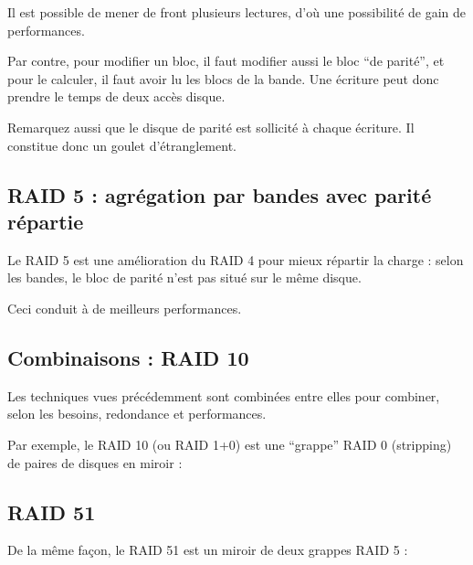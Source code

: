 \begin{multicols}{2}
Il est possible de mener de front plusieurs lectures, d'où une possibilité
de gain de performances.


Par contre, pour modifier un bloc, il faut modifier aussi le bloc ``de parité'',
et pour le calculer, il faut avoir lu les blocs de la bande. Une écriture
peut donc prendre le temps de deux accès disque.

Remarquez aussi que le disque de parité est sollicité à chaque écriture.
Il constitue donc un goulet d'étranglement.


\subsection{RAID 5 : agrégation par bandes avec parité répartie}

Le RAID 5 est une amélioration du RAID 4 pour mieux répartir la charge :
selon les bandes, le bloc de parité n'est pas situé sur le même disque.



Ceci conduit à de meilleurs performances.

\subsection{Combinaisons : RAID 10}

Les techniques vues précédemment sont combinées entre elles pour combiner, selon les besoins, redondance et performances.

Par exemple, le RAID 10 (ou RAID 1+0) est une ``grappe'' RAID 0 (stripping)
de paires de disques en miroir :




\subsection{RAID 51}

De la même façon, le RAID 51 est un miroir de deux grappes RAID 5 :


\end{multicols}

